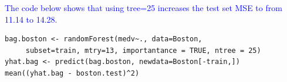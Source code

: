 \documentclass[aspectratio=1610]{beamer}
\theoremstyle{example}
\theoremstyle{definition}
\theoremstyle{rem}
\theoremstyle{theorm}
\begin{document}

\begin{frame}[fragile]
\textcolor{blue}{The code below shows that using tree=25 increases the test set MSE to from 11.14 to 14.28.}
\scriptsize
\begin{verbatim}
bag.boston <- randomForest(medv~., data=Boston, 
     subset=train, mtry=13, importantance = TRUE, ntree = 25)
yhat.bag <- predict(bag.boston, newdata=Boston[-train,])
mean((yhat.bag - boston.test)^2)
\end{verbatim}


\end{frame}
\end{document}
